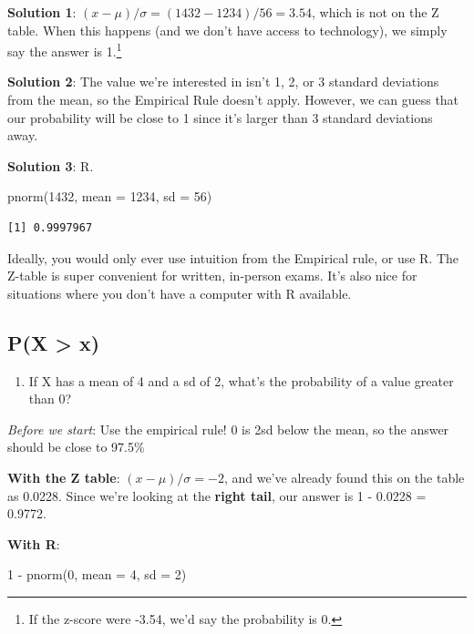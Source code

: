 \documentclass[
  letterpaper,
  DIV=11,
  numbers=noendperiod]{scrreprt}
\newenvironment{Shaded}{\begin{snugshade}}{\end{snugshade}}
\newcommand{\AttributeTok}[1]{\textcolor[rgb]{0.40,0.45,0.13}{#1}}
\newcommand{\DecValTok}[1]{\textcolor[rgb]{0.68,0.00,0.00}{#1}}
\newcommand{\FunctionTok}[1]{\textcolor[rgb]{0.28,0.35,0.67}{#1}}
\newcommand{\NormalTok}[1]{\textcolor[rgb]{0.00,0.23,0.31}{#1}}
\newcommand{\SpecialCharTok}[1]{\textcolor[rgb]{0.37,0.37,0.37}{#1}}
\providecommand{\tightlist}{%
  \setlength{\itemsep}{0pt}\setlength{\parskip}{0pt}}\usepackage{longtable,booktabs,array}
\begin{document}
\textbf{Solution 1}: \((x-\mu)/\sigma = (1432-1234)/56 = 3.54\), which
is not on the Z table. When this happens (and we don't have access to
technology), we simply say the answer is 1.\footnote{If the z-score were
  -3.54, we'd say the probability is 0.}

\textbf{Solution 2}: The value we're interested in isn't 1, 2, or 3
standard deviations from the mean, so the Empirical Rule doesn't apply.
However, we can guess that our probability will be close to 1 since it's
larger than 3 standard deviations away.

\textbf{Solution 3}: R.

\begin{Shaded}
\begin{Highlighting}[]
\FunctionTok{pnorm}\NormalTok{(}\DecValTok{1432}\NormalTok{, }\AttributeTok{mean =} \DecValTok{1234}\NormalTok{, }\AttributeTok{sd =} \DecValTok{56}\NormalTok{)}
\end{Highlighting}
\end{Shaded}

\begin{verbatim}
[1] 0.9997967
\end{verbatim}

Ideally, you would only ever use intuition from the Empirical rule, or
use R. The Z-table is super convenient for written, in-person exams.
It's also nice for situations where you don't have a computer with R
available.

\hypertarget{px-x}{%
\subsection{P(X \textgreater{} x)}\label{px-x}}

\begin{enumerate}
\def\labelenumi{\arabic{enumi}.}
\setcounter{enumi}{2}
\tightlist
\item
  If X has a mean of 4 and a sd of 2, what's the probability of a value
  greater than 0?
\end{enumerate}

\emph{Before we start}: Use the empirical rule! 0 is 2sd below the mean,
so the answer should be close to 97.5\%

\textbf{With the Z table}: \((x-\mu)/\sigma = -2\), and we've already
found this on the table as 0.0228. Since we're looking at the
\textbf{right tail}, our answer is 1 - 0.0228 = 0.9772.

\textbf{With R}:

\begin{Shaded}
\begin{Highlighting}[]
\DecValTok{1} \SpecialCharTok{{-}} \FunctionTok{pnorm}\NormalTok{(}\DecValTok{0}\NormalTok{, }\AttributeTok{mean =} \DecValTok{4}\NormalTok{, }\AttributeTok{sd =} \DecValTok{2}\NormalTok{)}
\end{Highlighting}
\end{Shaded}
\end{document}
